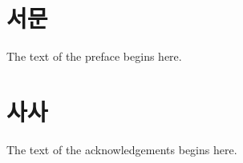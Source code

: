 \documentclass{report}
\begin{document}
\newpage 
~ 

\newpage 
~

\chapter*{서문}
The text of the preface begins here. 
%

\chapter*{사사}
The text of the acknowledgements begins here.

\renewcommand{\contentsname}{목차}
\tableofcontents
\end{document}

